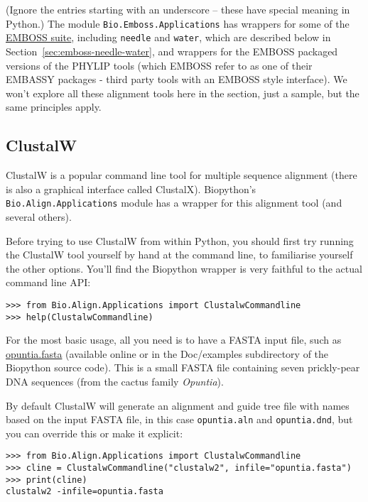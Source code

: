 \noindent (Ignore the entries starting with an underscore -- these have
special meaning in Python.)
The module \verb|Bio.Emboss.Applications| has wrappers for some of the
\href{http://emboss.sourceforge.net/}{EMBOSS suite}, including
\texttt{needle} and \texttt{water}, which are described below in
Section~\ref{sec:emboss-needle-water}, and wrappers for the EMBOSS
packaged versions of the PHYLIP tools (which EMBOSS refer to as one
of their EMBASSY packages - third party tools with an EMBOSS style
interface).
We won't explore all these alignment tools here in the section, just a
sample, but the same principles apply.

\subsection{ClustalW}
\label{sec:align_clustal}
ClustalW is a popular command line tool for multiple sequence alignment
(there is also a graphical interface called ClustalX). Biopython's
\verb|Bio.Align.Applications| module has a wrapper for this alignment tool
(and several others).

Before trying to use ClustalW from within Python, you should first try running
the ClustalW tool yourself by hand at the command line, to familiarise
yourself the other options. You'll find the Biopython wrapper is very
faithful to the actual command line API:

\begin{verbatim}
>>> from Bio.Align.Applications import ClustalwCommandline
>>> help(ClustalwCommandline)
\end{verbatim}

For the most basic usage, all you need is to have a FASTA input file, such as
\href{https://raw.githubusercontent.com/biopython/biopython/master/Doc/examples/opuntia.fasta}{opuntia.fasta}
(available online or in the Doc/examples subdirectory of the Biopython source
code). This is a small FASTA file containing seven prickly-pear DNA sequences
(from the cactus family \textit{Opuntia}).

By default ClustalW will generate an alignment and guide tree file with names
based on the input FASTA file, in this case \texttt{opuntia.aln} and
\texttt{opuntia.dnd}, but you can override this or make it explicit:

\begin{verbatim}
>>> from Bio.Align.Applications import ClustalwCommandline
>>> cline = ClustalwCommandline("clustalw2", infile="opuntia.fasta")
>>> print(cline)
clustalw2 -infile=opuntia.fasta
\end{verbatim}

